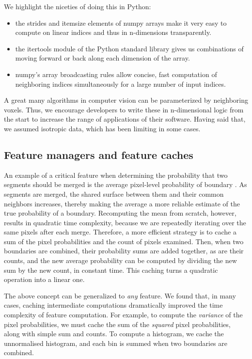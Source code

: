 \documentclass{frontiersSCNS} %
\begin{document}
We highlight the niceties of doing this in Python:
\begin{itemize}
\item the strides and itemsize elements of numpy arrays make it very easy to compute on linear indices and thus in n-dimensions transparently.
\item the itertools module of the Python standard library gives us combinations of moving forward or back along each dimension of the array.
\item numpy's array broadcasting rules allow concise, fast computation of neighboring indices simultaneously for a large number of input indices.
\end{itemize}

A great many algorithms in computer vision can be parameterized by neighboring voxels.
Thus, we encourage developers to write these in n-dimensional logic from the start to increase the range of applications of their software.
Having said that, we assumed isotropic data, which has been limiting in some cases.

\subsection{Feature managers and feature caches}

An example of a critical feature when determining the probability that two segments should be merged is the average pixel-level probability of boundary \citep{Ren:2003jg}.
As segments are merged, the shared surface between them and their common neighbors increases, thereby making the average a more reliable estimate of the true probability of a boundary.
Recomputing the mean from scratch, however, results in quadratic time complexity, because we are repeatedly iterating over the same pixels after each merge.
Therefore, a more efficient strategy is to cache a sum of the pixel probabilities and the count of pixels examined.
Then, when two boundaries are combined, their probability sums are added together, as are their counts, and the new average probability can be computed by dividing the new sum by the new count, in constant time.
This caching turns a quadratic operation into a linear one.

The above concept can be generalized to \emph{any} feature.
We found that, in many cases, caching intermediate computations dramatically improved the time complexity of feature computation.
For example, to compute the \emph{variance} of the pixel probabilities, we must cache the sum of the \emph{squared} pixel probabilities, along with simple sum and counts.
To compute a histogram, we cache the unnormalised histogram, and each bin is summed when two boundaries are combined.
\end{document}
